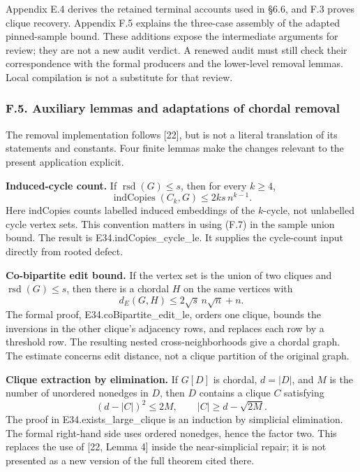 \documentclass[english,11pt,a4paper]{article}
\newcounter{none}
\begin{document}
Appendix E.4 derives the retained terminal accounts used in §6.6, and F.3 proves clique recovery. Appendix F.5 explains the three-case assembly of the adapted pinned-sample bound. These additions expose the intermediate arguments for review; they are not a new audit verdict. A renewed audit must still check their correspondence with the formal producers and the lower-level removal lemmas. Local compilation is not a substitute for that review.

\subsubsection{F.5. Auxiliary lemmas and adaptations of chordal removal}\label{f.5.-auxiliary-lemmas-and-adaptations-of-chordal-removal}

The removal implementation follows {[}22{]}, but is not a literal translation of its statements and constants. Four finite lemmas make the changes relevant to the present application explicit.

\textbf{Induced-cycle count.} If \(\operatorname{rsd}(G)\le s\), then for every \(k\ge4\), \[
\operatorname{indCopies}(C_k,G)\le2ks\,n^{k-1}.
\tag{F.7}
\] Here indCopies counts labelled induced embeddings of the \(k\)-cycle, not unlabelled cycle vertex sets. This convention matters in using (F.7) in the sample union bound. The result is {\ttfamily\small E34.\discretionary{\hbox{\ensuremath{\hookrightarrow}}}{}{}indCopies\_\discretionary{\hbox{\ensuremath{\hookrightarrow}}}{}{}cycle\_\discretionary{\hbox{\ensuremath{\hookrightarrow}}}{}{}le}. It supplies the cycle-count input directly from rooted defect.

\textbf{Co-bipartite edit bound.} If the vertex set is the union of two cliques and \(\operatorname{rsd}(G)\le s\), then there is a chordal \(H\) on the same vertices with \[
d_E(G,H)\le2\sqrt{s}\,n\sqrt n+n.
\tag{F.8}
\] The formal proof, {\ttfamily\small E34.\discretionary{\hbox{\ensuremath{\hookrightarrow}}}{}{}coBipartite\_\discretionary{\hbox{\ensuremath{\hookrightarrow}}}{}{}edit\_\discretionary{\hbox{\ensuremath{\hookrightarrow}}}{}{}le}, orders one clique, bounds the inversions in the other clique's adjacency rows, and replaces each row by a threshold row. The resulting nested cross-neighborhoods give a chordal graph. The estimate concerns edit distance, not a clique partition of the original graph.

\textbf{Clique extraction by elimination.} If \(G[D]\) is chordal, \(d=|D|\), and \(M\) is the number of unordered nonedges in \(D\), then \(D\) contains a clique \(C\) satisfying \[
(d-|C|)^2\le2M,\qquad |C|\ge d-\sqrt{2M}.
\tag{F.9}
\] The proof in {\ttfamily\small E34.\discretionary{\hbox{\ensuremath{\hookrightarrow}}}{}{}exists\_\discretionary{\hbox{\ensuremath{\hookrightarrow}}}{}{}large\_\discretionary{\hbox{\ensuremath{\hookrightarrow}}}{}{}clique} is an induction by simplicial elimination. The formal right-hand side uses ordered nonedges, hence the factor two. This replaces the use of {[}22, Lemma 4{]} inside the near-simplicial repair; it is not presented as a new version of the full theorem cited there.
\end{document}
